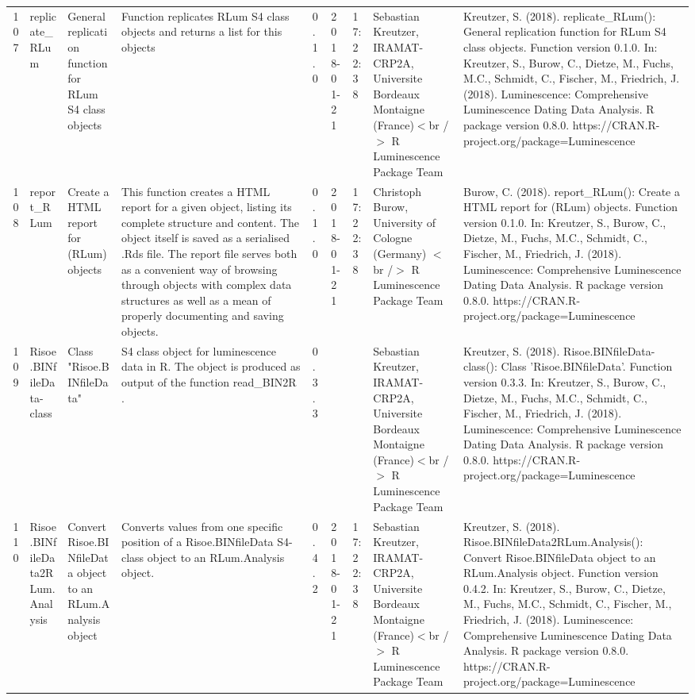 \begin{table}[ht]
\begin{tabular}{rllllllll}
 \\ 
  107 & replicate\_RLum & General replication function for RLum S4 class objects & Function replicates RLum S4 class objects and returns a list for this objects & 0.1.0 & 2018-01-21 & 17:22:38
 & Sebastian Kreutzer, IRAMAT-CRP2A, Universite Bordeaux Montaigne (France)$<$br /$>$  R Luminescence Package Team & Kreutzer, S. (2018). replicate\_RLum(): General replication function for RLum S4 class objects. Function version 0.1.0. In: Kreutzer, S., Burow, C., Dietze, M., Fuchs, M.C., Schmidt, C., Fischer, M., Friedrich, J. (2018). Luminescence: Comprehensive Luminescence Dating Data Analysis. R package version 0.8.0. https://CRAN.R-project.org/package=Luminescence
 \\ 
  108 & report\_RLum & Create a HTML report for (RLum) objects & This function creates a HTML report for a given object, listing its complete structure and content. The object itself is saved as a serialised .Rds file. The report file serves both as a convenient way of browsing through objects with complex data structures as well as a mean of properly documenting and saving objects. & 0.1.0 & 2018-01-21 & 17:22:38
 & Christoph Burow, University of Cologne (Germany)  $<$br /$>$  R Luminescence Package Team & Burow, C. (2018). report\_RLum(): Create a HTML report for (RLum) objects. Function version 0.1.0. In: Kreutzer, S., Burow, C., Dietze, M., Fuchs, M.C., Schmidt, C., Fischer, M., Friedrich, J. (2018). Luminescence: Comprehensive Luminescence Dating Data Analysis. R package version 0.8.0. https://CRAN.R-project.org/package=Luminescence
 \\ 
  109 & Risoe.BINfileData-class & Class  "Risoe.BINfileData" & S4 class object for luminescence data in R. The object is produced as output of the function  read\_BIN2R . & 0.3.3
 &  &  & Sebastian Kreutzer, IRAMAT-CRP2A, Universite Bordeaux Montaigne (France)$<$br /$>$  R Luminescence Package Team & Kreutzer, S. (2018). Risoe.BINfileData-class(): Class 'Risoe.BINfileData'. Function version 0.3.3. In: Kreutzer, S., Burow, C., Dietze, M., Fuchs, M.C., Schmidt, C., Fischer, M., Friedrich, J. (2018). Luminescence: Comprehensive Luminescence Dating Data Analysis. R package version 0.8.0. https://CRAN.R-project.org/package=Luminescence
 \\ 
  110 & Risoe.BINfileData2RLum.Analysis & Convert Risoe.BINfileData object to an RLum.Analysis object & Converts values from one specific position of a Risoe.BINfileData S4-class object to an RLum.Analysis object. & 0.4.2 & 2018-01-21 & 17:22:38
 & Sebastian Kreutzer, IRAMAT-CRP2A, Universite Bordeaux Montaigne (France)$<$br /$>$  R Luminescence Package Team & Kreutzer, S. (2018). Risoe.BINfileData2RLum.Analysis(): Convert Risoe.BINfileData object to an RLum.Analysis object. Function version 0.4.2. In: Kreutzer, S., Burow, C., Dietze, M., Fuchs, M.C., Schmidt, C., Fischer, M., Friedrich, J. (2018). Luminescence: Comprehensive Luminescence Dating Data Analysis. R package version 0.8.0. https://CRAN.R-project.org/package=Luminescence

\end{tabular}
\end{table}

